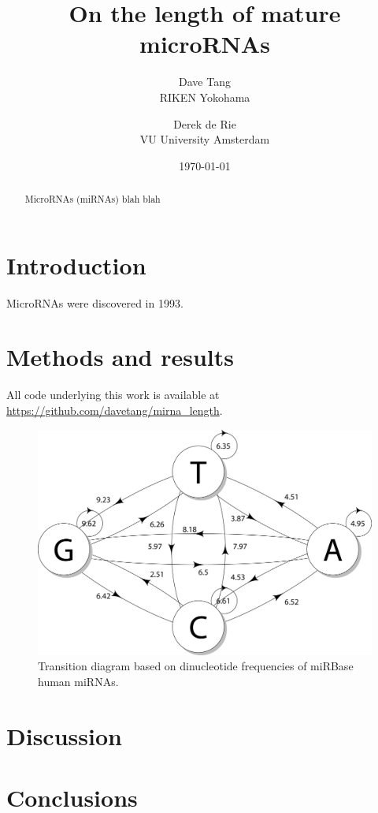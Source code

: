 \documentclass{article}
\title{On the length of mature microRNAs}
\author{Dave Tang  \\
	RIKEN Yokohama \\
	\and 
	Derek de Rie \\
	VU University Amsterdam \\
	}
\date{\today}
\begin{document}
\maketitle

\begin{abstract}
MicroRNAs (miRNAs) blah blah

\end{abstract}

\section{Introduction}

MicroRNAs were discovered in 1993\cite{pmid8252621}.

\section{Methods and results}\label{method_and_result}

All code underlying this work is available at \url{https://github.com/davetang/mirna_length}.

\begin{figure}[h]
   \centering
   \includegraphics[width=\textwidth,natwidth=3297,natheight=2227]{image/transition.png}
   \caption{Transition diagram based on dinucleotide frequencies of miRBase human miRNAs.}
   \label{fig:transition}
\end{figure}

\section{Discussion}\label{discussion}

\section{Conclusions}\label{conclusion}



\end{document}
